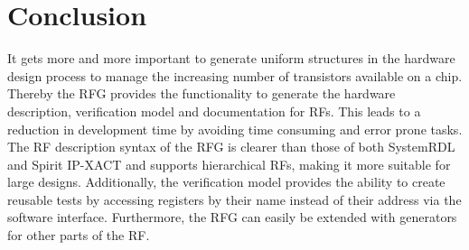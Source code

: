\section{Conclusion}
It gets more and more important to generate uniform structures in the hardware design process to manage the increasing number of transistors available on a chip.\\
Thereby the RFG provides the functionality to generate the hardware description, verification model and documentation for RFs. This leads to a reduction in development time by avoiding time consuming and error prone tasks. The RF description syntax of the RFG is clearer than those of both SystemRDL and Spirit IP-XACT and supports hierarchical RFs, making it more suitable for large designs. Additionally, the verification model provides the ability to create reusable tests by accessing registers by their name instead of their address via the software interface. Furthermore, the RFG can easily be extended with generators for other parts of the RF.
